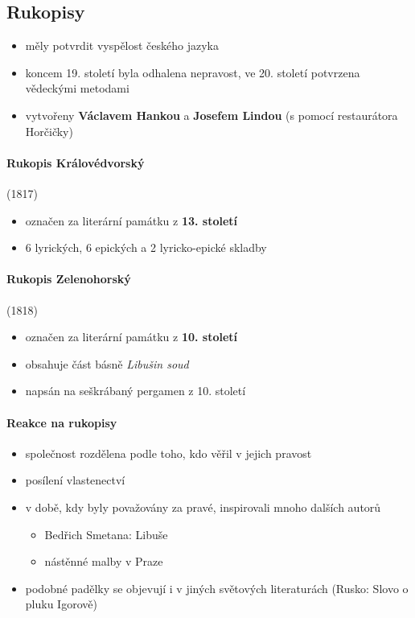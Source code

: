 \subsection{Rukopisy}
\begin{itemize}
\item měly potvrdit vyspělost českého jazyka
\item koncem 19. století byla odhalena nepravost, ve 20. století potvrzena vědeckými metodami
\item vytvořeny \textbf{Václavem Hankou} a \textbf{Josefem Lindou} (s pomocí restaurátora Horčičky)
\end{itemize}

\paragraph{Rukopis Královédvorský} (1817)
\begin{itemize}
\item označen za literární památku z \textbf{13. století}
\item 6 lyrických, 6 epických a 2 lyricko-epické skladby
\end{itemize}

\paragraph{Rukopis Zelenohorský} (1818)
\begin{itemize}
\item označen za literární památku z \textbf{10. století}
\item obsahuje část básně \textit{Libušin soud}
\item napsán na seškrábaný pergamen z 10. století
\end{itemize}

\paragraph{Reakce na rukopisy}
\begin{itemize}
\item společnost rozdělena podle toho, kdo věřil v jejich pravost
\item posílení vlastenectví
\item v době, kdy byly považovány za pravé, inspirovali mnoho dalších autorů
	\begin{itemize}
	\item Bedřich Smetana: Libuše
	\item nástěnné malby v Praze
	\end{itemize}
\item podobné padělky se objevují i v jiných světových literaturách (Rusko: Slovo o pluku Igorově)
\end{itemize}



